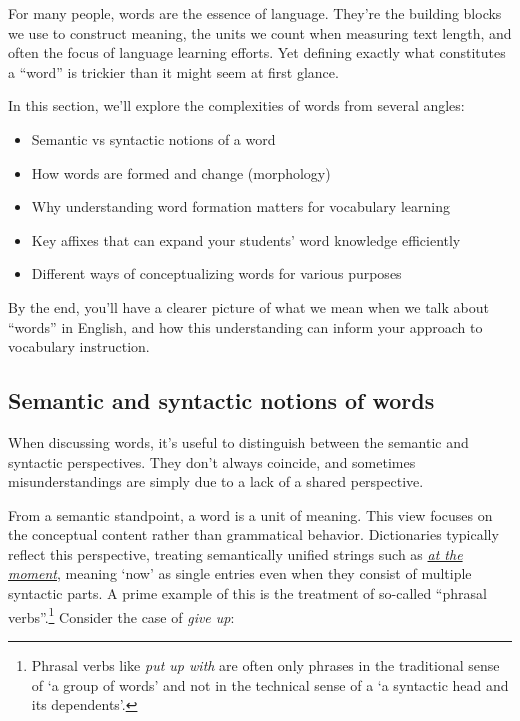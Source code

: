 For many people, words are the essence of language. They're the building blocks we use to construct meaning, the units we count when measuring text length, and often the focus of language learning efforts. Yet defining exactly what constitutes a ``word'' is trickier than it might seem at first glance.

In this section, we'll explore the complexities of words from several angles:

\begin{itemize}
    \item Semantic vs syntactic notions of a word
    \item How words are formed and change (morphology)
    \item Why understanding word formation matters for vocabulary learning
    \item Key affixes that can expand your students' word knowledge efficiently
    \item Different ways of conceptualizing words for various purposes
\end{itemize}

By the end, you'll have a clearer picture of what we mean when we talk about ``words'' in English, and how this understanding can inform your approach to vocabulary instruction.

\subsection{Semantic and syntactic notions of words}

When discussing words, it's useful to distinguish between the semantic and syntactic perspectives. They don't always coincide, and sometimes misunderstandings are simply due to a lack of a shared perspective.

From a semantic standpoint, a word is a unit of meaning. This view focuses on the conceptual content rather than grammatical behavior. Dictionaries typically reflect this perspective, treating semantically unified strings such as \href{https://www.ldoceonline.com/dictionary/have-a-go}{\textit{at the moment}}, meaning `now' as single entries even when they consist of multiple syntactic parts. A prime example of this is the treatment of so-called ``phrasal verbs''.\footnote{Phrasal verbs like \textit{put up with} are often only phrases in the traditional sense of `a group of words' and not in the technical sense of a `a syntactic head and its dependents'.} Consider the case of \textit{give up}:

